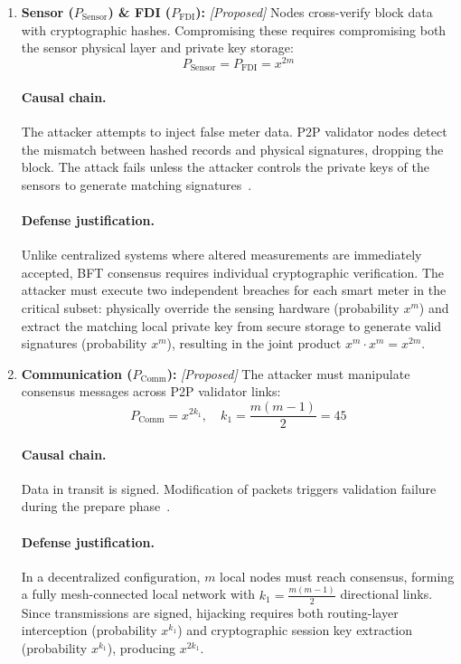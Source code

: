 \documentclass[10pt,twocolumn,journal]{IEEEtran}
\begin{document}
\begin{enumerate}[leftmargin=*]
    \item \textbf{Sensor ($P_{\mathrm{Sensor}}$) \& FDI ($P_{\mathrm{FDI}}$):} \emph{[Proposed]} Nodes cross-verify block data with cryptographic hashes. Compromising these requires compromising both the sensor physical layer and private key storage:
    \begin{equation}
    \label{eq:sensor_fdi_bc}
    P_{\mathrm{Sensor}} = P_{\mathrm{FDI}} = x^{2m}
    \end{equation}
    \paragraph{Causal chain.} The attacker attempts to inject false meter data. P2P validator nodes detect the mismatch between hashed records and physical signatures, dropping the block. The attack fails unless the attacker controls the private keys of the sensors to generate matching signatures~\cite{ding2024}.
    \paragraph{Defense justification.} Unlike centralized systems where altered measurements are immediately accepted, BFT consensus requires individual cryptographic verification. The attacker must execute two independent breaches for each smart meter in the critical subset: physically override the sensing hardware (probability $x^m$) and extract the matching local private key from secure storage to generate valid signatures (probability $x^m$), resulting in the joint product $x^m \cdot x^m = x^{2m}$.

    \item \textbf{Communication ($P_{\mathrm{Comm}}$):} \emph{[Proposed]} The attacker must manipulate consensus messages across P2P validator links:
    \begin{equation}
    \label{eq:comm_bc}
    P_{\mathrm{Comm}} = x^{2k_1}, \quad k_1 = \frac{m(m-1)}{2} = 45
    \end{equation}
    \paragraph{Causal chain.} Data in transit is signed. Modification of packets triggers validation failure during the prepare phase~\cite{castro1999}.
    \paragraph{Defense justification.} In a decentralized configuration, $m$ local nodes must reach consensus, forming a fully mesh-connected local network with $k_1 = \frac{m(m-1)}{2}$ directional links. Since transmissions are signed, hijacking requires both routing-layer interception (probability $x^{k_1}$) and cryptographic session key extraction (probability $x^{k_1}$), producing $x^{2k_1}$.


\end{enumerate}
\end{document}
